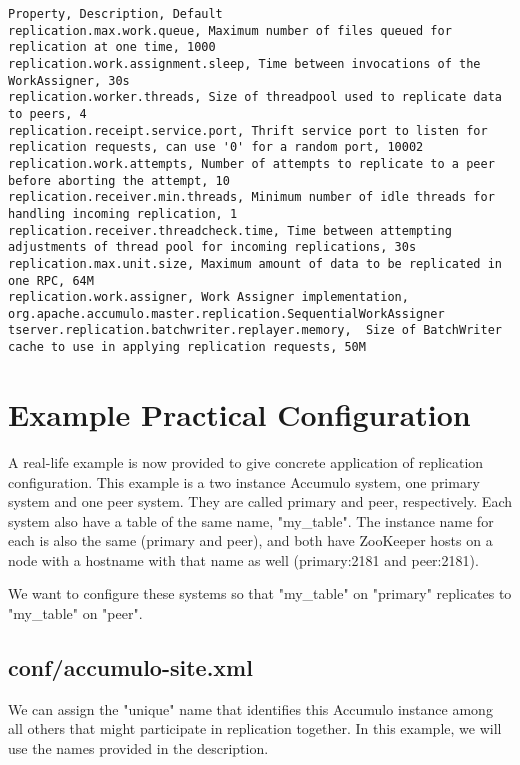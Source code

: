 \begingroup\fontsize{8pt}{8pt}\selectfont\begin{verbatim}
Property, Description, Default
replication.max.work.queue, Maximum number of files queued for replication at one time, 1000
replication.work.assignment.sleep, Time between invocations of the WorkAssigner, 30s
replication.worker.threads, Size of threadpool used to replicate data to peers, 4
replication.receipt.service.port, Thrift service port to listen for replication requests, can use '0' for a random port, 10002
replication.work.attempts, Number of attempts to replicate to a peer before aborting the attempt, 10
replication.receiver.min.threads, Minimum number of idle threads for handling incoming replication, 1
replication.receiver.threadcheck.time, Time between attempting adjustments of thread pool for incoming replications, 30s
replication.max.unit.size, Maximum amount of data to be replicated in one RPC, 64M
replication.work.assigner, Work Assigner implementation, org.apache.accumulo.master.replication.SequentialWorkAssigner
tserver.replication.batchwriter.replayer.memory,  Size of BatchWriter cache to use in applying replication requests, 50M
\end{verbatim}\endgroup

\section{Example Practical Configuration}

A real-life example is now provided to give concrete application of replication configuration. This
example is a two instance Accumulo system, one primary system and one peer system. They are called
primary and peer, respectively. Each system also have a table of the same name, "my\_table". The instance
name for each is also the same (primary and peer), and both have ZooKeeper hosts on a node with a hostname
with that name as well (primary:2181 and peer:2181).

We want to configure these systems so that "my\_table" on "primary" replicates to "my\_table" on "peer".

\subsection{conf/accumulo-site.xml}

We can assign the "unique" name that identifies this Accumulo instance among all others that might participate
in replication together. In this example, we will use the names provided in the description.

